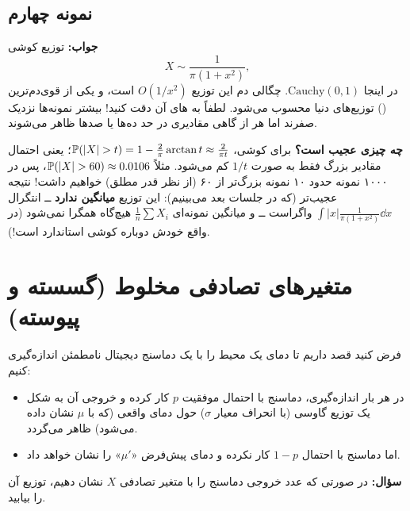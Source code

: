 \subsection{نمونه چهارم}
\textbf{جواب:} توزیع کوشی
\[
X\sim\frac{1}{\pi(1+x^2)},
\]
در اینجا $\mathrm{Cauchy}(0,1)$. چگالی دم این توزیع $O(1/x^2)$ است، و یکی از قوی‌دم‌ترین () توزیع‌های دنیا محسوب می‌شود. لطفاً به های آن دقت کنید! بیشتر نمونه‌ها نزدیک صفرند اما هر از گاهی مقادیری در حد ده‌ها یا صدها ظاهر می‌شوند.

\begin{note}
\notetitle \textbf{چه چیزی عجیب است؟} برای کوشی، $\Prob(|X|>t)=1-\frac2\pi\arctan t\approx\frac{2}{\pi t}$؛ یعنی احتمال مقادیر بزرگ فقط به صورت $1/t$ کم می‌شود. مثلاً $\Prob(|X|>60)\approx0.0106$، پس در ۱۰۰۰ نمونه حدود ۱۰ نمونه بزرگ‌تر از ۶۰ (از نظر قدر مطلق) خواهیم داشت! نتیجه عجیب‌تر (که در جلسات بعد می‌بینیم): این توزیع \textbf{میانگین ندارد} ــ انتگرال $\int|x|\frac{1}{\pi(1+x^2)}\dd x$ واگراست ــ و میانگین نمونه‌ای $\frac1n\sum X_i$ هیچ‌گاه همگرا نمی‌شود (در واقع خودش دوباره کوشی استاندارد است!).
\end{note}

\begin{center}
\end{center}

\section{متغیرهای تصادفی مخلوط (گسسته و پیوسته)}

\begin{example}
فرض کنید قصد داریم تا دمای یک محیط را با یک دماسنج دیجیتال نامطمئن اندازه‌گیری کنیم:
\begin{itemize}
\item در هر بار اندازه‌گیری، دماسنج با احتمال موفقیت $p$ کار کرده و خروجی آن به شکل یک توزیع گاوسی (با انحراف معیار $\sigma$) حول دمای واقعی (که با $\mu$ نشان داده می‌شود) ظاهر می‌گردد.
\item اما دماسنج با احتمال $1-p$ کار نکرده و دمای پیش‌فرض «$\mu'$» را نشان خواهد داد.
\end{itemize}
\textbf{سؤال:} در صورتی که عدد خروجی دماسنج را با متغیر تصادفی $X$ نشان دهیم، توزیع آن را بیابید.
\end{example}


